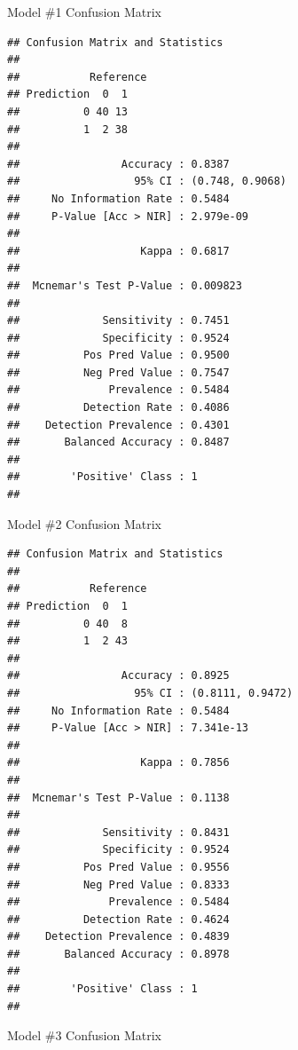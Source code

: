 \documentclass[
]{article}
\begin{document}
Model \#1 Confusion Matrix

\begin{verbatim}
## Confusion Matrix and Statistics
## 
##           Reference
## Prediction  0  1
##          0 40 13
##          1  2 38
##                                          
##                Accuracy : 0.8387         
##                  95% CI : (0.748, 0.9068)
##     No Information Rate : 0.5484         
##     P-Value [Acc > NIR] : 2.979e-09      
##                                          
##                   Kappa : 0.6817         
##                                          
##  Mcnemar's Test P-Value : 0.009823       
##                                          
##             Sensitivity : 0.7451         
##             Specificity : 0.9524         
##          Pos Pred Value : 0.9500         
##          Neg Pred Value : 0.7547         
##              Prevalence : 0.5484         
##          Detection Rate : 0.4086         
##    Detection Prevalence : 0.4301         
##       Balanced Accuracy : 0.8487         
##                                          
##        'Positive' Class : 1              
## 
\end{verbatim}

Model \#2 Confusion Matrix

\begin{verbatim}
## Confusion Matrix and Statistics
## 
##           Reference
## Prediction  0  1
##          0 40  8
##          1  2 43
##                                           
##                Accuracy : 0.8925          
##                  95% CI : (0.8111, 0.9472)
##     No Information Rate : 0.5484          
##     P-Value [Acc > NIR] : 7.341e-13       
##                                           
##                   Kappa : 0.7856          
##                                           
##  Mcnemar's Test P-Value : 0.1138          
##                                           
##             Sensitivity : 0.8431          
##             Specificity : 0.9524          
##          Pos Pred Value : 0.9556          
##          Neg Pred Value : 0.8333          
##              Prevalence : 0.5484          
##          Detection Rate : 0.4624          
##    Detection Prevalence : 0.4839          
##       Balanced Accuracy : 0.8978          
##                                           
##        'Positive' Class : 1               
## 
\end{verbatim}

Model \#3 Confusion Matrix
\end{document}
